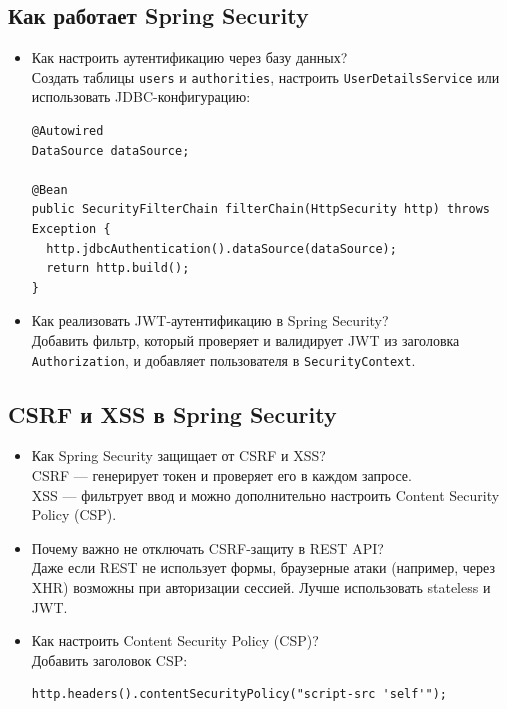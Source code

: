 \documentclass[a4paper,14pt]{article}
\begin{document}
\subsection{Как работает Spring Security}

\begin{itemize}
\item Как настроить аутентификацию через базу данных? \\
Создать таблицы \texttt{users} и \texttt{authorities}, настроить \texttt{UserDetailsService} или использовать JDBC-конфигурацию:
\begin{lstlisting}[style=javastyle]
@Autowired
DataSource dataSource;

@Bean
public SecurityFilterChain filterChain(HttpSecurity http) throws Exception {
  http.jdbcAuthentication().dataSource(dataSource);
  return http.build();
}
\end{lstlisting}

\item Как реализовать JWT-аутентификацию в Spring Security? \\
Добавить фильтр, который проверяет и валидирует JWT из заголовка \texttt{Authorization}, и добавляет пользователя в \texttt{SecurityContext}.
\end{itemize}

\subsection{CSRF и XSS в Spring Security}

\begin{itemize}
\item Как Spring Security защищает от CSRF и XSS? \\
CSRF — генерирует токен и проверяет его в каждом запросе. \\
XSS — фильтрует ввод и можно дополнительно настроить Content Security Policy (CSP).

\item Почему важно не отключать CSRF-защиту в REST API? \\
Даже если REST не использует формы, браузерные атаки (например, через XHR) возможны при авторизации сессией. Лучше использовать stateless и JWT.

\item Как настроить Content Security Policy (CSP)? \\
Добавить заголовок CSP:
\begin{lstlisting}[style=javastyle]
http.headers().contentSecurityPolicy("script-src 'self'");
\end{lstlisting}
\end{itemize}
\end{document}
